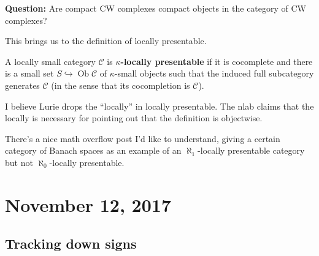 \documentclass{amsart}
\DeclareMathOperator{\Ob}{Ob}
\begin{document}
\textbf{Question:} Are compact CW complexes compact objects in the category of
CW complexes?

This brings us to the definition of locally presentable.
\begin{definition}
    A locally small category $\mathcal{C}$ is \textbf{$\kappa$-locally presentable} if it
    is cocomplete and there is a small set $S\hookrightarrow\Ob\mathcal{C}$
    of $\kappa$-small objects such that the induced full subcategory generates $\mathcal{C}$
    (in the sense that its cocompletion is $\mathcal{C}$).
\end{definition}
\begin{remark}
    I believe Lurie drops the ``locally'' in locally presentable. The nlab claims
    that the locally is necessary for pointing out that the definition is objectwise.
\end{remark}

There's a nice math overflow post I'd like to understand, giving a certain category
of Banach spaces as an example of an $\aleph_1$-locally presentable category but not
$\aleph_0$-locally presentable.

\section{November 12, 2017}

\subsection{Tracking down signs}
\end{document}
